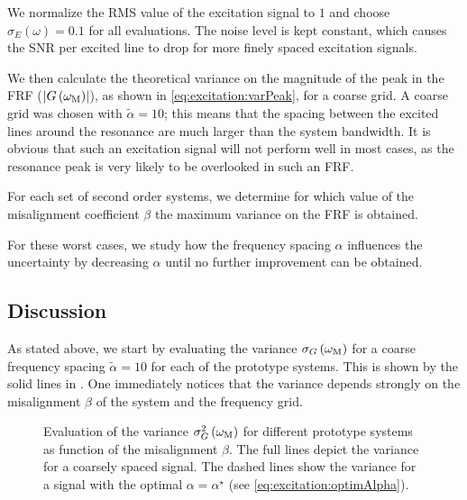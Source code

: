   We normalize the \gls{RMS} value of the excitation signal to $1$ and choose $\sigma_E\left( \omega \right) = 0.1$ for all evaluations.
  The noise level is kept constant, which causes the \gls{SNR} per excited line to drop for more finely spaced excitation signals.
  
  We then calculate the theoretical variance on the magnitude of the peak in the \gls{FRF} ($\left|  G\left( \omega_{\mathrm{M}} \right)  \right|$), as shown in \eqref{eq:excitation:varPeak}, for a coarse grid.
  A coarse grid was chosen with $\tilde{\alpha} = 10$; this means that the spacing between the excited lines around the resonance are much larger than the system bandwidth.
  It is obvious that such an excitation signal will not perform well in most cases, as the resonance peak is very likely to be overlooked in such an \gls{FRF}.
  
  For each set of second order systems, we determine for which value of the misalignment coefficient $\beta$ the maximum variance on the FRF is obtained.
  
  For these worst cases, we study how the frequency spacing $\alpha$ influences the uncertainty by decreasing $\alpha$ until no further improvement can be obtained.

  \subsection{Discussion} 
  \label{sec:excitation:bestFrequencyResolution}
  As stated above, we start by evaluating the variance $\sigma_G\left( \omega_{\mathrm{M}}\right)$ for a coarse frequency spacing $\tilde{\alpha} = 10$ for each of the prototype systems.
  This is shown by the solid lines in .
  One immediately notices that the variance depends strongly on the misalignment $\beta$ of the system and the frequency grid.
  
  \begin{figure}
    \centering
      \setlength{}
      \setlength\figureheight{0.62\figurewidth}
    
    \caption[Variance $\sigma_G^2\left( \wM \right)$ as a function of the grid misalignment $\beta$.]{Evaluation of the variance $\sigma_G^2\left( \wM \right) $ for different prototype systems as function of the misalignment $\beta$.
             The full lines depict the variance for a coarsely spaced signal.
             The dashed lines show the variance for a signal with the optimal $\alpha = \alpha^{\star}$ (see \eqref{eq:excitation:optimAlpha}).}
    \label{fig:excitation:worstCaseBeta}
    \vspace{-0.5em} %
  \end{figure}

